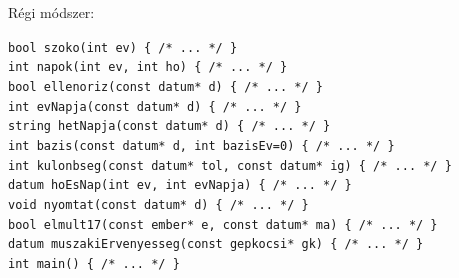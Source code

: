 \documentclass[usenames,dvipsnames,aspectratio=169]{beamer}
\begin{document}
\begin{frame}
  \footnotesize
  Régi módszer:\\
  \begin{alertblock}{}
    \texttt{bool szoko(int ev) \{ /* ... */ \}}\\
    \texttt{int napok(int ev, int ho) \{ /* ... */ \}}\\
    \texttt{bool ellenoriz(const datum* d) \{ /* ... */ \}}\\
    \texttt{int evNapja(const datum* d) \{ /* ... */ \}}\\
    \texttt{string hetNapja(const datum* d) \{ /* ... */ \}}\\
    \texttt{int bazis(const datum* d, int bazisEv=0) \{ /* ... */ \}}\\
    \texttt{int kulonbseg(const datum* tol, const datum* ig) \{ /* ... */ \}}\\
    \texttt{datum hoEsNap(int ev, int evNapja) \{ /* ... */ \}}\\
    \texttt{void nyomtat(const datum* d) \{ /* ... */ \}}\\
    \vspace{3mm}
    \texttt{bool elmult17(const ember* e, const datum* ma) \{ /* ... */ \}}\\
    \vspace{3mm}
    \texttt{datum muszakiErvenyesseg(const gepkocsi* gk) \{ /* ... */ \}}\\
    \vspace{3mm}
    \texttt{int main() \{ /* ... */ \}}\\
  \end{alertblock}
\end{frame}
\end{document}
